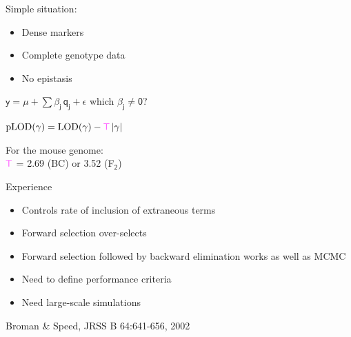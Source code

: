 \documentclass[12pt]{article}
\newcommand{\headsize}{\fontsize{35}{35} \selectfont}
\newcommand{\smallersize}{\fontsize{20}{25} \selectfont}
\newcommand{\smallestsize}{\fontsize{18}{22} \selectfont}
\newcommand{\lod}{\text{LOD}}
\newcommand{\plod}{\text{pLOD}}
\begin{document}
\hfill \begin{minipage}{10in}

Simple situation:

{\smallestsize
\color{myblue}
\begin{itemize}
\item Dense markers
\item Complete genotype data
\item No epistasis

\end{itemize} }

\vspace{2cm}

\centerline{
$\mathsf{y  = \mu + \sum \beta_j \, q_j + \epsilon}$ \hspace{1cm}
       {\color{mypink} which $\mathsf{\beta_j \ne 0}$?}
}

\vspace{2cm}

{\color{myyellow}
$\mathsf{ \plod(\gamma) = \lod(\gamma) -
    {\color{mypink} T} \, |\gamma| }$
}

\vspace{2cm}

\begin{minipage}[t]{10in}
\vspace*{0mm}

For the mouse genome: \\[6pt]
\hspace*{0.5in} $\mathsf{\color{mypink} T}$ = {\color{myblue}
  2.69} (BC) or {\color{myblue} 3.52} (F$_{\mathsf{2}}$)
\end{minipage}

\end{minipage}




\newpage

\headsize \color{myyellow}
\hfill \begin{minipage}{5.75in}
\centering
Experience
\end{minipage}

\vspace{3cm} \color{mywhite} \smallersize

\hfill \begin{minipage}{10in}

\begin{itemize}
\itemsep18pt
\item Controls rate of inclusion of extraneous terms
\item Forward selection over-selects
\item {\color{myblue} Forward selection followed by backward elimination} works as well
  as {\color{myblue} MCMC}

\item {\color{mypink} Need to define performance criteria}
\item {\color{mypink} Need large-scale simulations}
\end{itemize}

\vspace{6cm}

\smallestsize \color{myblue}
\hfill Broman \& Speed, JRSS B 64:641-656, 2002

\end{minipage}
\end{document}
